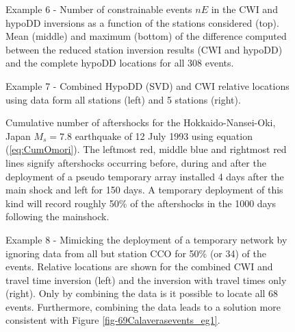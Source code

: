 \documentclass[12pt,double]{article}
\begin{document}
\begin{figure}
\caption{Example 6 - Number of constrainable events $nE$ in the CWI
and hypoDD inversions as a function of the stations considered
(top). Mean (middle) and maximum (bottom) of the difference computed
between the reduced station inversion results (CWI and hypoDD) and
the complete hypoDD locations for all 308 events. }
\label{fig-statremoval_summarystats}
\end{figure}



\begin{figure}
\caption{Example 7 - Combined HypoDD (SVD) and CWI relative
locations using data form all stations (left) and 5 stations
(right).} \label{fig-68Calaverasevents_ttandcoda1}
\end{figure}




\begin{figure}
\caption{Cumulative number of aftershocks for the
Hokkaido-Nansei-Oki, Japan $M_s=7.8$ earthquake of 12 July 1993
using equation (\ref{eq:CumOmori}). The leftmost red, middle blue
and rightmost red lines signify aftershocks occurring before, during
and after the deployment of a pseudo temporary array installed 4
days after the main shock and left for 150 days. A temporary
deployment of this kind will record roughly 50\% of the aftershocks
in the 1000 days following the mainshock. } \label{fig:Omorifigure}
\end{figure}



\begin{figure}
\caption{Example 8 - Mimicking the deployment of a temporary network
by ignoring data from all but station CCO for 50\% (or 34) of the
events. Relative locations are shown for the combined CWI and travel
time inversion (left) and the inversion with travel times only
(right). Only by combining the data is it possible to locate all 68
events. Furthermore, combining the data leads to a solution more
consistent with Figure \ref{fig-69Calaverasevents_eg1}. }
\label{fig-68Calaverasevents_ttsubsetandcoda1}
\end{figure}
\end{document}
